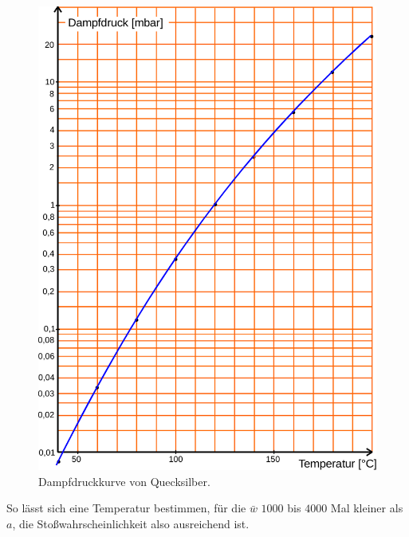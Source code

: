 \begin{figure}
    \centering
    \includegraphics{figures/Abb_4.pdf}
    \caption{Dampfdruckkurve von Quecksilber\cite{ap08}.}
    \label{fig:abb4}
\end{figure}

So lässt sich eine Temperatur bestimmen, für die $\bar{w}$  $1000$ bis $4000$ Mal kleiner als $a$, die
Stoßwahrscheinlichkeit also ausreichend ist.

